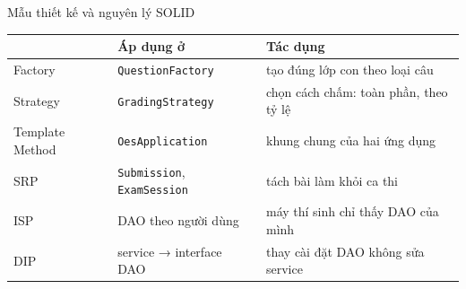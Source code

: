 \documentclass[aspectratio=169,11pt]{beamer}
\begin{document}
\begin{frame}{Mẫu thiết kế và nguyên lý SOLID}
  \centering\small\renewcommand{\arraystretch}{1.25}
  \begin{tabular}{@{}lll@{}}
    \toprule
    & \textbf{Áp dụng ở} & \textbf{Tác dụng} \\
    \midrule
    Factory          & \texttt{QuestionFactory} & tạo đúng lớp con theo loại câu \\
    Strategy         & \texttt{GradingStrategy} & chọn cách chấm: toàn phần, theo tỷ lệ \\
    Template Method  & \texttt{OesApplication}  & khung chung của hai ứng dụng \\
    \midrule
    SRP & \texttt{Submission}, \texttt{ExamSession} & tách bài làm khỏi ca thi \\
    ISP & DAO theo người dùng                       & máy thí sinh chỉ thấy DAO của mình \\
    DIP & service → interface DAO                   & thay cài đặt DAO không sửa service \\
    \bottomrule
  \end{tabular}
\end{frame}

\end{document}
